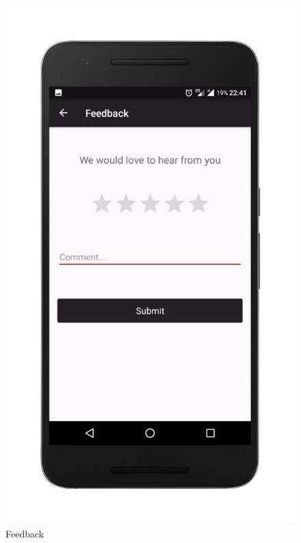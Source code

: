 
%
\begin{figure}[ht]
\centering
\includegraphics[scale=0.13]{images/f.png}
\caption{Feedback}
\end{figure}

